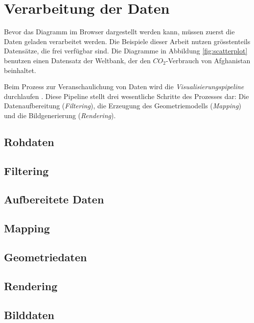 \section{Verarbeitung der Daten}

Bevor das Diagramm im Browser dargestellt werden kann, müssen zuerst die Daten geladen verarbeitet werden. Die Beispiele dieser Arbeit nutzen grösstenteils Datensätze, die frei verfügbar sind.  %
Die Diagramme in Abbildung \ref{fig:scatterplot} benutzen einen Datensatz der Weltbank, der den $CO_2$-Verbrauch von Afghanistan beinhaltet.

Beim Prozess zur Veranschaulichung von Daten wird die \textit{Visualisierungspipeline} durchlaufen \cite{pipeline}. Diese Pipeline stellt drei wesentliche Schritte des Prozesses dar: Die Datenaufbereitung (\textit{Filtering}), die Erzeugung des Geometriemodells (\textit{Mapping}) und die Bildgenerierung (\textit{Rendering}).


\subsection{Rohdaten}

\subsection{Filtering}

\subsection{Aufbereitete Daten}

\subsection{Mapping}

\subsection{Geometriedaten}

\subsection{Rendering}

\subsection{Bilddaten}